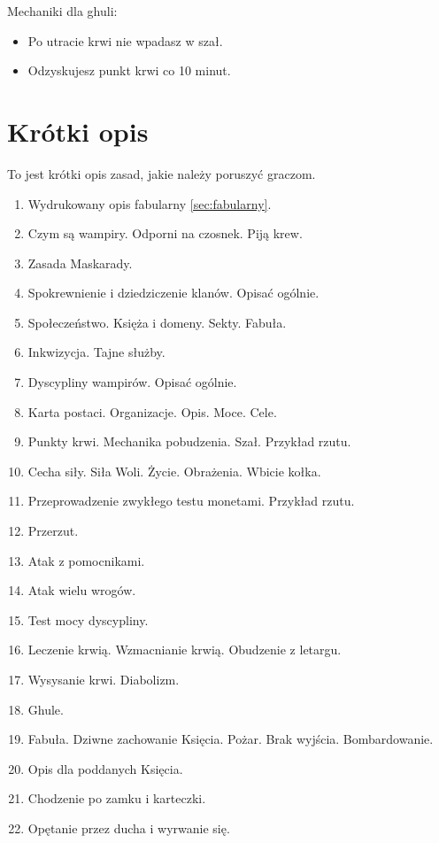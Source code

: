 	Mechaniki dla ghuli:
	\begin{itemize}
		\item Po utracie krwi nie wpadasz w szał.
		\item Odzyskujesz punkt krwi co 10 minut.
	\end{itemize}

		
\section{Krótki opis}
	To jest krótki opis zasad, jakie należy poruszyć graczom.
	\begin{enumerate}
		\item Wydrukowany opis fabularny \ref{sec:fabularny}.
		\item Czym są wampiry. Odporni na czosnek. Piją krew.
		\item Zasada Maskarady.
		\item Spokrewnienie i dziedziczenie klanów. Opisać ogólnie.
		\item Społeczeństwo. Księża i domeny. Sekty. Fabuła.
		\item Inkwizycja. Tajne służby.
		\item Dyscypliny wampirów. Opisać ogólnie.
		\item Karta postaci. Organizacje. Opis. Moce. Cele.
		\item Punkty krwi. Mechanika pobudzenia. Szał. Przykład rzutu.
		\item Cecha siły. Siła Woli. Życie. Obrażenia. Wbicie kołka.
		\item Przeprowadzenie zwykłego testu monetami. Przykład rzutu.
		\item Przerzut.
		\item Atak z pomocnikami.
		\item Atak wielu wrogów.
		\item Test mocy dyscypliny.
		\item Leczenie krwią. Wzmacnianie krwią. Obudzenie z letargu.
		\item Wysysanie krwi. Diabolizm.
		\item Ghule.
		\item Fabuła. Dziwne zachowanie Księcia. Pożar. Brak wyjścia. Bombardowanie.
		\item Opis dla poddanych Księcia.
		\item Chodzenie po zamku i karteczki.
		\item Opętanie przez ducha i wyrwanie się.
	\end{enumerate}


